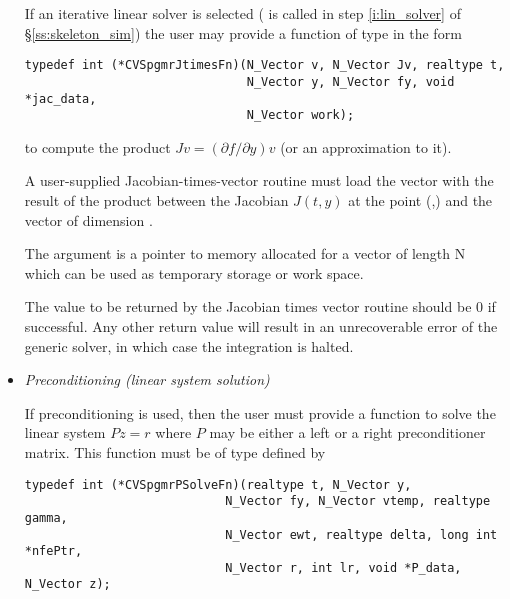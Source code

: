 \begin{itemize}
  If an iterative {\spgmr} linear solver is selected ( is called in step 
  \ref{i:lin_solver} of \S\ref{ss:skeleton_sim}) the user may provide a function
  of type  in the form 
\begin{verbatim}
typedef int (*CVSpgmrJtimesFn)(N_Vector v, N_Vector Jv, realtype t,
                               N_Vector y, N_Vector fy, void *jac_data,
                               N_Vector work);
\end{verbatim} 
  to compute the product $J v = (\partial f / \partial y) v$ (or an approximation to it).
  
  A user-supplied Jacobian-times-vector routine must load the vector 
  with the result of the product between the Jacobian $J(t,y)$ at the
  point (,) and the vector  of dimension .

  The argument  is a pointer to 
  memory allocated for a vector of length N which can be used 
  as temporary storage or work space.

  The value to be returned by the Jacobian times vector routine should be
  $0$ if successful. Any other return value will result in an unrecoverable
  error of the {\spgmr} generic solver, in which case the integration is halted.
  
%
%
\item {\em Preconditioning (linear system solution)}
  \label{p:psolve}
  
  If preconditioning is used, then the user must provide a {\C} function to
  solve the linear system $Pz = r$ where $P$ may be either a left or a
  right preconditioner matrix.
  This function must be of type  defined by
\begin{verbatim}
typedef int (*CVSpgmrPSolveFn)(realtype t, N_Vector y, 
                            N_Vector fy, N_Vector vtemp, realtype gamma, 
                            N_Vector ewt, realtype delta, long int *nfePtr, 
                            N_Vector r, int lr, void *P_data, N_Vector z);
\end{verbatim}
  

\end{itemize}
